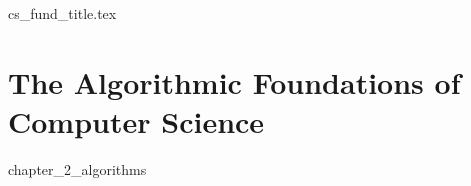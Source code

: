 \documentclass[A4,12pt,twoside]{book}
\begin{document}
	\frontmatter
	{cs_fund_title.tex}
	\clearpage
	\thispagestyle{empty}
	
	\tableofcontents
	
	\mainmatter
	
	
\part{The Algorithmic Foundations of Computer Science}
{chapter_2_algorithms}
\end{document}

